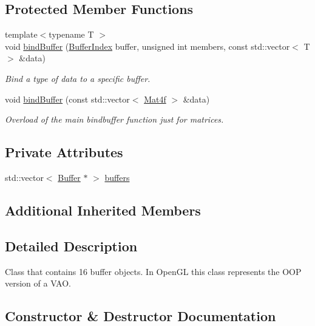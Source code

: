 \subsection*{Protected Member Functions}
\begin{DoxyCompactItemize}
\item 
{\footnotesize template$<$typename T $>$ }\\void \hyperlink{classpcs_1_1rend_1_1BufferArray_a91985342659ddd8d0de2ae408082d1e0}{bind\+Buffer} (\hyperlink{namespacepcs_1_1rend_a731e43a479c7b7b61dd23586494ee61b}{Buffer\+Index} buffer, unsigned int members, const std\+::vector$<$ T $>$ \&data)
\begin{DoxyCompactList}\small\item\em Bind a type of data to a specific buffer. \end{DoxyCompactList}\item 
void \hyperlink{classpcs_1_1rend_1_1BufferArray_a3a1eef9f823d9f76c13e01ea31a2d381}{bind\+Buffer} (const std\+::vector$<$ \hyperlink{structpcs_1_1Mat4f}{Mat4f} $>$ \&data)
\begin{DoxyCompactList}\small\item\em Overload of the main bindbuffer function just for matrices. \end{DoxyCompactList}\end{DoxyCompactItemize}
\subsection*{Private Attributes}
\begin{DoxyCompactItemize}
\item 
std\+::vector$<$ \hyperlink{classpcs_1_1rend_1_1Buffer}{Buffer} $\ast$ $>$ \hyperlink{classpcs_1_1rend_1_1BufferArray_a9e2281d3dab3361dd8b9aca55c53e4a7}{buffers}
\end{DoxyCompactItemize}
\subsection*{Additional Inherited Members}


\subsection{Detailed Description}
Class that contains 16 buffer objects. In Open\+GL this class represents the O\+OP version of a V\+AO. 

\subsection{Constructor \& Destructor Documentation}
\mbox{\label{classpcs_1_1rend_1_1BufferArray_a8e4885f9616165139b318a1b879691e5}} 
